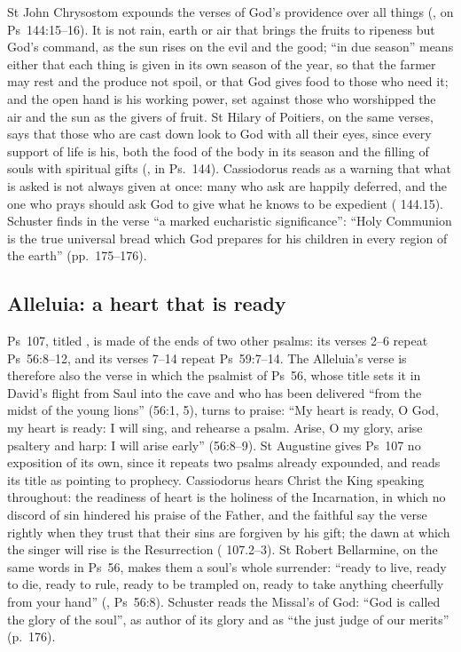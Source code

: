 St John Chrysostom expounds the verses of God's providence over all things
(, on Ps~144:15--16). It is not rain, earth or air
that brings the fruits to ripeness but God's command, as the sun rises on the
evil and the good; ``in due season'' means either that each thing is given in
its own season of the year, so that the farmer may rest and the produce not
spoil, or that God gives food to those who need it; and the open hand is his
working power, set against those who worshipped the air and the sun as the
givers of fruit. St Hilary of Poitiers, on the same verses, says that those
who are cast down look to God with all their eyes, since every support of life
is his, both the food of the body in its season and the filling of souls with
spiritual gifts (, in Ps.~144). Cassiodorus
reads  as a warning that what is asked is not always
given at once: many who ask are happily deferred, and the one who prays should
ask God to give what he knows to be expedient (
144.15). Schuster finds in the verse ``a marked eucharistic significance'':
``Holy Communion is the true universal bread which God prepares for his
children in every region of the earth'' (pp.~175--176).

\subsection{Alleluia: a heart that is ready}

Ps~107, titled , is made of the ends of two
other psalms: its verses 2--6 repeat Ps~56:8--12, and its verses 7--14 repeat
Ps~59:7--14. The Alleluia's verse is therefore also the verse in which the
psalmist of Ps~56, whose title sets it in David's flight from Saul into the
cave and who has been delivered ``from the midst of the young lions'' (56:1,
5), turns to praise: ``My heart is ready, O God, my heart is ready: I will sing,
and rehearse a psalm. Arise, O my glory, arise psaltery and harp: I will arise
early'' (56:8--9). St Augustine gives Ps~107 no exposition of its own, since it
repeats two psalms already expounded, and reads its title as pointing to
prophecy. Cassiodorus hears Christ the King speaking throughout: the readiness
of heart is the holiness of the Incarnation, in which no discord of sin hindered
his praise of the Father, and the faithful say the verse rightly when they
trust that their sins are forgiven by his gift; the dawn at which the singer
will rise is the Resurrection ( 107.2--3). St Robert
Bellarmine, on the same words in Ps~56, makes them a soul's whole surrender:
``ready to live, ready to die, ready to rule, ready to be trampled on, ready to
take anything cheerfully from your hand'' (, Ps~56:8). Schuster reads the Missal's  of God: ``God
is called the glory of the soul'', as author of its glory and as ``the just
judge of our merits'' (p.~176).

